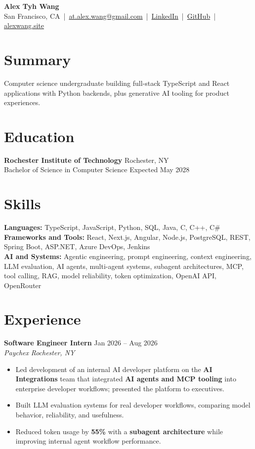 \documentclass[10pt,letterpaper]{article}
\newif\ifresumeFirstRole
\newcommand{\resumeRole}[4]{%
  \ifresumeFirstRole
    \global\resumeFirstRolefalse
  \else
    \vspace{0pt plus 1fill}%
  \fi
  \textbf{#1} \hfill #2\\
  \textit{#3} \hfill \textit{#4}
}
\begin{document}
\begin{center}
{\Large \textbf{Alex Tyh Wang}}\\
San Francisco, CA \,|\, \href{mailto:at.alex.wang@gmail.com}{at.alex.wang@gmail.com} \,|\, \href{https://www.linkedin.com/in/alex-tyh-wang/}{LinkedIn} \,|\, \href{https://github.com/alextyhwang}{GitHub} \,|\, \href{https://alexwang.site}{alexwang.site}
\end{center}

\section*{Summary}
Computer science undergraduate building full-stack TypeScript and React applications with Python backends, plus generative AI tooling for product experiences.

\section*{Education}
\textbf{Rochester Institute of Technology} \hfill Rochester, NY\\
Bachelor of Science in Computer Science \hfill Expected May 2028

\section*{Skills}
\textbf{Languages:} TypeScript, JavaScript, Python, SQL, Java, C, C++, C\#\\
\textbf{Frameworks and Tools:} React, Next.js, Angular, Node.js, PostgreSQL, REST, Spring Boot, ASP.NET, Azure DevOps, Jenkins\\
\textbf{AI and Systems:} Agentic engineering, prompt engineering, context engineering, LLM evaluation, AI agents, multi-agent systems, subagent architectures, MCP, tool calling, RAG, model reliability, token optimization, OpenAI API, OpenRouter

\section*{Experience}
\resumeRole{Software Engineer Intern}{Jan 2026 -- Aug 2026}{Paychex}{Rochester, NY}
\begin{itemize}
  \item Led development of an internal AI developer platform on the \textbf{AI Integrations} team that integrated \textbf{AI agents and MCP tooling} into enterprise developer workflows; presented the platform to executives.
  \item Built LLM evaluation systems for real developer workflows, comparing model behavior, reliability, and usefulness.
  \item Reduced token usage by \textbf{55\%} with a \textbf{subagent architecture} while improving internal agent workflow performance.
\end{itemize}
\end{document}
